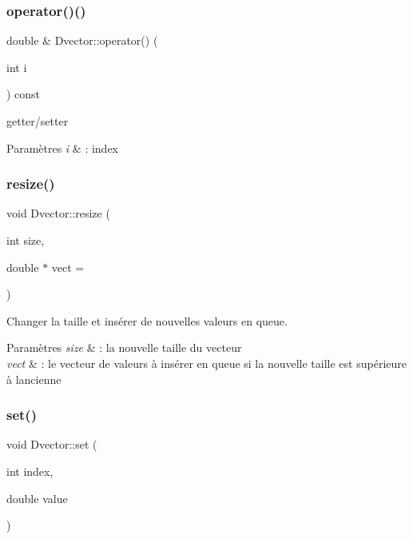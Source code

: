 \subsubsection{\texorpdfstring{operator()()}{operator()()}}
{\footnotesize\ttfamily double \& Dvector\+::operator() (\begin{DoxyParamCaption}\item[{int}]{i }\end{DoxyParamCaption}) const}



getter/setter 


\begin{DoxyParams}{Paramètres}
{\em i} & \+: index \\
\hline
\end{DoxyParams}
\mbox{\label{class_dvector_a3df83649e0ed9cf7c21fe03fdef8b2f4}} 
\subsubsection{\texorpdfstring{resize()}{resize()}}
{\footnotesize\ttfamily void Dvector\+::resize (\begin{DoxyParamCaption}\item[{int}]{size,  }\item[{double $\ast$}]{vect = {} }\end{DoxyParamCaption})}



Changer la taille et insérer de nouvelles valeurs en queue. 


\begin{DoxyParams}{Paramètres}
{\em size} & \+: la nouvelle taille du vecteur \\
\hline
{\em vect} & \+: le vecteur de valeurs à insérer en queue si la nouvelle taille est supérieure à l\textquotesingle{}ancienne \\
\hline
\end{DoxyParams}
\mbox{\label{class_dvector_a2ea1ba5bf87cebf7e74cb0dd94f90e12}} 
\subsubsection{\texorpdfstring{set()}{set()}}
{\footnotesize\ttfamily void Dvector\+::set (\begin{DoxyParamCaption}\item[{int}]{index,  }\item[{double}]{value }\end{DoxyParamCaption})}



